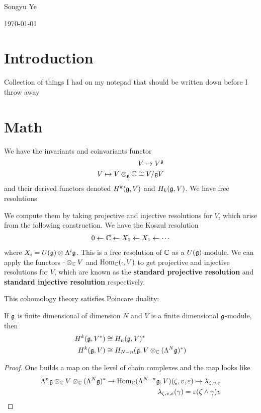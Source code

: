 \documentclass[12pt]{article}
\begin{document}
Songyu Ye

\today
\section{Introduction}
Collection of things I had on my notepad that should be written down before I throw away
\section{Math}
We have the invariants and coinvariants functor \begin{align*}
    V\mapsto V^{\mathfrak{g}}\\
    V\mapsto V\otimes_{\mathfrak{g}} \mathbb{C} \cong V/\mathfrak{g} V
\end{align*} and their derived functors denoted $H^k(\mathfrak{g}, V)$ and $H_k(\mathfrak{g}, V)$. We have free resolutions

We compute them by taking projective and injective resolutions for $V$, which arise from
the following construction. We have the Koszul resolution \begin{align*}
    0 \leftarrow \mathbb{C} \leftarrow X_0 \leftarrow X_1 \leftarrow \cdots
\end{align*} where $X_i = U(\mathfrak{g})\otimes \Lambda^i \mathfrak{g}$. This is a free resolution of $\mathbb{C}$ as a $U(\mathfrak{g})$-module. 
We can apply the functors $\cdot \otimes_{\mathbb{C}} V$ and $\operatorname{Hom}_{\mathbb{C}}(\cdot, V)$ to get projective and injective resolutions for $V$,
which are known as the \textbf{standard projective resolution} and \textbf{standard injective resolution} respectively.

This cohomology theory satisfies Poincare duality:
\begin{theorem}
    If $\mathfrak{g}$ is finite dimensional of dimension $N$ and $V$ is a finite dimensional $\mathfrak{g}$-module, then
    \begin{align*}
        H^k(\mathfrak{g}, V^*) &\cong H_{n}(\mathfrak{g}, V)^* \\
        H^k(\mathfrak{g}, V) &\cong H_{N-n}(\mathfrak{g}, V\otimes_{\mathbb{C}} (\Lambda^N \mathfrak{g})^*)
    \end{align*}
\end{theorem}
\begin{proof}
    One builds a map on the level of chain complexes and the map looks like \begin{align*}
        \Lambda^n\mathfrak{g} \otimes_{\mathbb{C}} V \otimes_{\mathbb{C}} (\Lambda^N \mathfrak{g})^* \to \operatorname{Hom}_{\mathbb{C}}(\Lambda^{N-n}\mathfrak{g}, V)
        (\zeta,v,\varepsilon)\mapsto \lambda_{\zeta,v,\varepsilon} \\
        \lambda_{\zeta,v,\varepsilon}(\gamma) = \varepsilon(\zeta \wedge \gamma )v
    \end{align*}
\end{proof}
\end{document}
